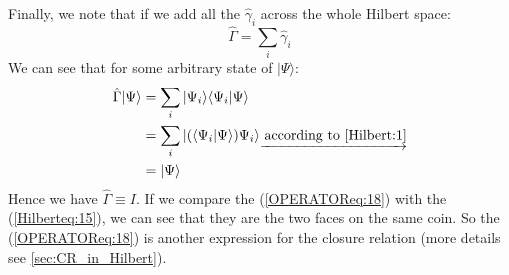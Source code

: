 Finally, we note that if we add all the $\hat{\gamma}_{i}$ across
the whole Hilbert space:
\begin{equation}\label{}
\hat{\Gamma} = \sum_{i} \hat{\gamma}_{i}
\end{equation}
We can see that for some arbitrary state of $|\Psi\rangle$:
\begin{align}\label{OPERATOReq:18}
\hat{\Gamma}|\Psi\rangle &=
\sum_{i}|\Psi_{i}\rangle\langle\Psi_{i}|\Psi\rangle \nonumber \\
&=\sum_{i}|(\langle\Psi_{i}|\Psi\rangle)\Psi_{i}\rangle
\underrightarrow{
\text{ according to \ref{Hilbert:1}}}\nonumber \\
&=|\Psi\rangle
\end{align}
Hence we have $\hat{\Gamma} \equiv I$. If we compare the
(\ref{OPERATOReq:18}) with the (\ref{Hilberteq:15}), we can see that
they are the two faces on the same coin. So the
(\ref{OPERATOReq:18}) is another expression for the closure relation
(more details see \ref{sec:CR_in_Hilbert}).



